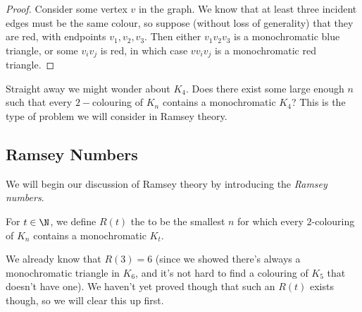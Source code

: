 \begin{proof}
	Consider some vertex $v$ in the graph. We know that at least three incident edges must be the same colour, so suppose (without loss of generality) that they are red, with endpoints $v_1, v_2, v_3$. Then either $v_1 v_2 v_3$ is a monochromatic blue triangle, or some $v_i v_j$ is red, in which case $v v_i v_j$ is a monochromatic red triangle.
\end{proof}

Straight away we might wonder about $K_4$. Does there exist some large enough $n$ such that every $2-$colouring of $K_n$ contains a monochromatic $K_4$? This is the type of problem we will consider in Ramsey theory.


\subsection{Ramsey Numbers}\label{sec:ramseynums}

We will begin our discussion of Ramsey theory by introducing the \emph{Ramsey numbers}.

\begin{definition}
	For $t \in \N$, we define $R(t)$ the  to be the smallest $n$ for which every $2$-colouring of $K_n$ contains a monochromatic $K_t$.
\end{definition}

We already know that $R(3) = 6$ (since we showed there's always a monochromatic triangle in $K_6$, and it's not hard to find a colouring of $K_5$ that doesn't have one). We haven't yet proved though that such an $R(t)$ exists though, so we will clear this up first.


